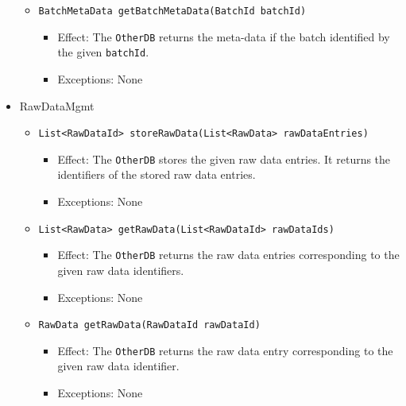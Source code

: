 \documentclass[a4paper,10pt]{article}
\begin{document}
\begin{itemize}
\begin{itemize}
        \item \texttt{BatchMetaData getBatchMetaData(BatchId batchId)}
        \begin{itemize}
            \item Effect: The \texttt{OtherDB} returns the meta-data if the batch identified by the given \texttt{batchId}.
            \item Exceptions: None
        \end{itemize}
    \end{itemize}    
    
    	\item RawDataMgmt
    \begin{itemize}
        \item \texttt{List<RawDataId> storeRawData(List<RawData> rawDataEntries)}
        \begin{itemize}
            \item Effect: The \texttt{OtherDB} stores the given raw data entries. It returns the identifiers of the stored raw data entries.
            \item Exceptions: None
        \end{itemize}
        
        \item \texttt{List<RawData> getRawData(List<RawDataId> rawDataIds)}
        \begin{itemize}
            \item Effect: The \texttt{OtherDB} returns the raw data entries corresponding to the given raw data identifiers.
            \item Exceptions: None
        \end{itemize}
        
            \item \texttt{RawData getRawData(RawDataId rawDataId)}
        \begin{itemize}
            \item Effect: The \texttt{OtherDB} returns the raw data entry corresponding to the given raw data identifier.
            \item Exceptions: None
        \end{itemize}
    \end{itemize} 
    
\end{itemize}
\end{document}
